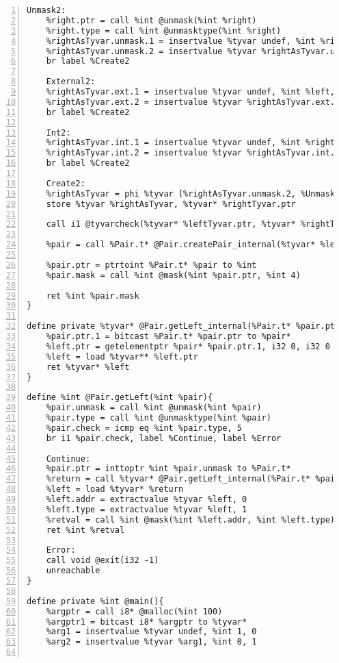 \begin{lstlisting}[frame=single,numbers=left, language={[x86masm]Assembler}, caption={[Pair Structure: LLVM]Translation of the Pair structure.},
label=llvm:polymorphic]
	Unmask2:
	%right.ptr = call %int @unmask(%int %right)
	%right.type = call %int @unmasktype(%int %right)
	%rightAsTyvar.unmask.1 = insertvalue %tyvar undef, %int %right.ptr, 0
	%rightAsTyvar.unmask.2 = insertvalue %tyvar %rightAsTyvar.unmask.1, %int %right.type, 1
	br label %Create2

	External2:
	%rightAsTyvar.ext.1 = insertvalue %tyvar undef, %int %left, 0
	%rightAsTyvar.ext.2 = insertvalue %tyvar %rightAsTyvar.ext.1, %int 0, 1
	br label %Create2

	Int2:
	%rightAsTyvar.int.1 = insertvalue %tyvar undef, %int %right, 0
	%rightAsTyvar.int.2 = insertvalue %tyvar %rightAsTyvar.int.1, %int 1, 1
	br label %Create2

	Create2:
	%rightAsTyvar = phi %tyvar [%rightAsTyvar.unmask.2, %Unmask2], [%rightAsTyvar.ext.2, %External2], [%rightAsTyvar.int.2,%Int2]
	store %tyvar %rightAsTyvar, %tyvar* %rightTyvar.ptr

	call i1 @tyvarcheck(%tyvar* %leftTyvar.ptr, %tyvar* %rightTyvar.ptr) ; type equation

	%pair = call %Pair.t* @Pair.createPair_internal(%tyvar* %leftTyvar.ptr, %tyvar* %rightTyvar.ptr)

	%pair.ptr = ptrtoint %Pair.t* %pair to %int
	%pair.mask = call %int @mask(%int %pair.ptr, %int 4)

	ret %int %pair.mask
}

define private %tyvar* @Pair.getLeft_internal(%Pair.t* %pair.ptr){
	%pair.ptr.1 = bitcast %Pair.t* %pair.ptr to %pair*
	%left.ptr = getelementptr %pair* %pair.ptr.1, i32 0, i32 0 ;%tyvar**
	%left = load %tyvar** %left.ptr
	ret %tyvar* %left
}

define %int @Pair.getLeft(%int %pair){
	%pair.unmask = call %int @unmask(%int %pair)
	%pair.type = call %int @unmasktype(%int %pair)
	%pair.check = icmp eq %int %pair.type, 5
	br i1 %pair.check, label %Continue, label %Error

	Continue:
	%pair.ptr = inttoptr %int %pair.unmask to %Pair.t*
	%return = call %tyvar* @Pair.getLeft_internal(%Pair.t* %pair.ptr)
	%left = load %tyvar* %return
	%left.addr = extractvalue %tyvar %left, 0
	%left.type = extractvalue %tyvar %left, 1
	%retval = call %int @mask(%int %left.addr, %int %left.type)
	ret %int %retval

	Error:
	call void @exit(i32 -1)
	unreachable
}

define private %int @main(){
	%argptr = call i8* @malloc(%int 100)
	%argptr1 = bitcast i8* %argptr to %tyvar*
	%arg1 = insertvalue %tyvar undef, %int 1, 0
	%arg2 = insertvalue %tyvar %arg1, %int 0, 1
	

\end{lstlisting}

